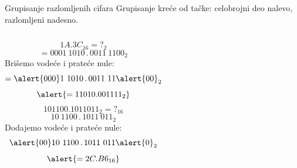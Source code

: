 \begin{frame}[label=04-s020]{Grupisanje razlomljenih cifara}
\setlength{\abovedisplayskip}{3pt}\setlength{\belowdisplayskip}{3pt}
Grupisanje kreće od tačke: celobrojni deo \alert{nalevo}, razlomljeni \alert{nadesno}.
\par\vspace{2mm}
\begin{columns}[T,onlytextwidth]
\[1A.3C_{16}={?}_2\]
\[=0001\ 1010\,.\,0011\ 1100_2\]
Brišemo vodeće i prateće nule:
\[=\alert{000}1\ 1010\,.\,0011\ 11\alert{00}_2\]
\[\alert{=11010.001111_2}\]
\[101100.1011011_2={?}_{16}\]
\[10\ 1100\,.\,1011\ 011_2\]
Dodajemo vodeće i prateće nule:
\[\alert{00}10\ 1100\,.\,1011\ 011\alert{0}_2\]
\[\alert{=2C.B6_{16}}\]
\end{columns}
\par\vspace{3mm}
\end{frame}
